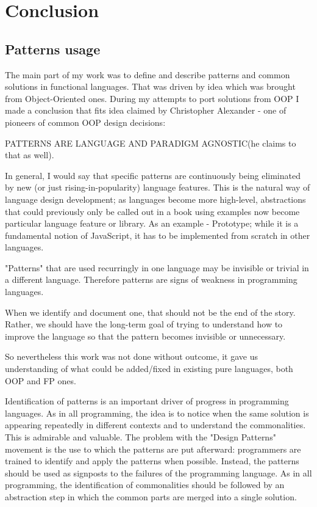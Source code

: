 \chapter{Conclusion}
\label{chap:conclusion}

\section{Patterns usage}

The main part of my work was to define and describe patterns and common solutions in functional languages.
That was driven by idea which was brought from Object-Oriented ones. During my attempts to port solutions from OOP I made a conclusion that fits idea claimed by Christopher Alexander - one of pioneers of common OOP design decisions:

PATTERNS ARE LANGUAGE AND PARADIGM AGNOSTIC(he claims to that as well).

In general, I would say that specific patterns are continuously being eliminated by new (or just rising-in-popularity) language features. This is the natural way of language design development; as languages become more high-level, abstractions that could previously only be called out in a book using examples now become particular language feature or library.
As an example - Prototype; while it is a fundamental notion of JavaScript, it has to be implemented from scratch in other languages.

"Patterns" that are used recurringly in one language may be invisible or trivial in a different language.
Therefore patterns are signs of weakness in programming languages.

When we identify and document one, that should not be the end of the story. Rather, we should have the long-term goal of trying to understand how to improve the language so that the pattern becomes invisible or unnecessary.

So nevertheless this work was not done without outcome, it gave us understanding of what could be added/fixed in existing pure languages, both OOP and FP ones.

Identification of patterns is an important driver of progress in programming languages. As in all programming, the idea is to notice when the same solution is appearing repeatedly in different contexts and to understand the commonalities. This is admirable and valuable. The problem with the "Design Patterns" movement is the use to which the patterns are put afterward: programmers are trained to identify and apply the patterns when possible. Instead, the patterns should be used as signposts to the failures of the programming language. As in all programming, the identification of commonalities should be followed by an abstraction step in which the common parts are merged into a single solution.

